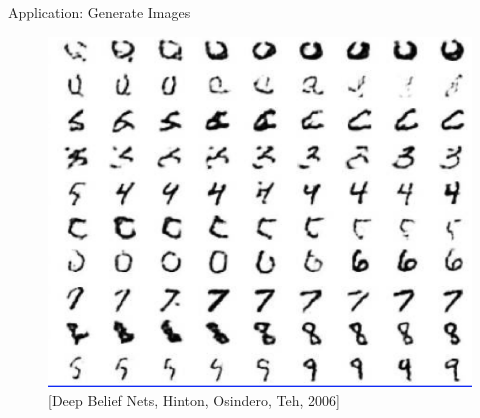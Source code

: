 \begin{frame}[allowframebreaks]{Application: Generate Images}
    \begin{figure}
    \centering
    \includegraphics[height=0.8\textheight]{images/dul/slide_19_1_img.png}
    \caption{[Deep Belief Nets, Hinton, Osindero, Teh, 2006]}
    \end{figure}

    \framebreak


\end{frame}
